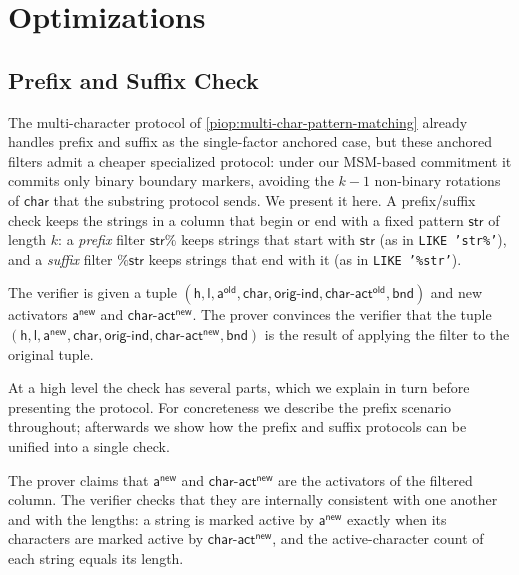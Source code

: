 

    \section{Optimizations} 
    \subsection{Prefix and Suffix Check} 
    \label{sec:prefix-suffix} 
    The multi-character protocol of \cref{piop:multi-char-pattern-matching} already handles prefix and suffix as the single-factor anchored case, but these anchored filters admit a cheaper specialized protocol: under our MSM-based commitment it commits only binary boundary markers, avoiding the $k-1$ non-binary rotations of $\mathsf{char}$ that the substring protocol sends. We present it here. A prefix/suffix check keeps the strings in a column that begin or end with a fixed pattern $\mathsf{str}$ of length $k$: a \emph{prefix} filter $\mathsf{str}\%$ keeps strings that start with $\mathsf{str}$ (as in \texttt{LIKE 'str\%'}), and a \emph{suffix} filter $\%\mathsf{str}$ keeps strings that end with it (as in \texttt{LIKE '\%str'}).

    The verifier is given a tuple $( \mathsf{h},\mathsf{l},\mathsf{a^{old}}, \mathsf{char}, \mathsf{orig\text{-}ind}, \mathsf{char\text{-}act^{old}}, \mathsf{bnd})$ and new activators $\mathsf{a^{new}}$ and $\mathsf{char\text{-}act^{new}}$. The prover convinces the verifier that the tuple $( \mathsf{h},\mathsf{l},\mathsf{a^{new}}, \mathsf{char}, \mathsf{orig\text{-}ind}, \mathsf{char\text{-}act^{new}}, \mathsf{bnd})$ is the result of applying the filter to the original tuple.


At a high level the check has several parts, which we explain in turn before presenting the protocol. For concreteness we describe the prefix scenario throughout; afterwards we show how the prefix and suffix protocols can be unified into a single check.


 The prover claims that $\mathsf{a^{new}}$ and $\mathsf{char\text{-}act^{new}}$ are the activators of the filtered column. The verifier checks that they are internally consistent with one another and with the lengths: a string is marked active by $\mathsf{a^{new}}$ exactly when its characters are marked active by $\mathsf{char\text{-}act^{new}}$, and the active-character count of each string equals its length.

